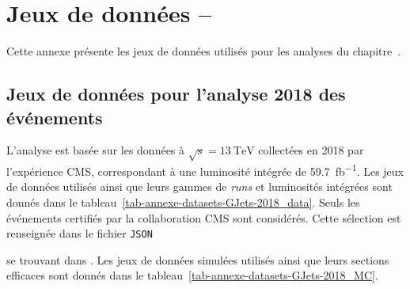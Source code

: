 \chapter{Jeux de données -- \Gjets}\label{annexe-datasets-GJets}

Cette annexe présente les jeux de données utilisés pour les analyses du chapitre~.

\section{Jeux de données pour l'analyse 2018 des événements \Gjets}
L'analyse est basée sur les données à $\sqrt{s}=\SI{13}{\TeV}$ collectées en 2018 par l'expérience CMS, correspondant à une luminosité intégrée de \SI{59.7}{\femto\barn^{-1}}.
Les jeux de données utilisés ainsi que leurs gammes de \emph{runs} et luminosités intégrées sont donnés dans le tableau~\ref{tab-annexe-datasets-GJets-2018_data}.
Seuls les événements certifiés par la collaboration CMS sont considérés. Cette sélection est renseignée dans le fichier \texttt{JSON}
\begin{center}
\end{center}
se trouvant dans .
Les jeux de données simulées utilisés ainsi que leurs sections efficaces sont donnés dans le tableau~\ref{tab-annexe-datasets-GJets-2018_MC}.

